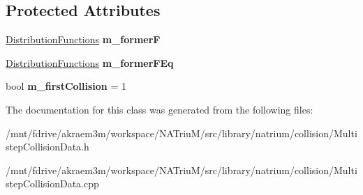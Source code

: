 \subsection*{Protected Attributes}
\begin{DoxyCompactItemize}
\item 
\hypertarget{classnatrium_1_1MultistepCollisionData_aba80100f70bb18575f636eb22c797dca}{
\hyperlink{classnatrium_1_1DistributionFunctions}{DistributionFunctions} {\bfseries m\_\-formerF}}
\label{classnatrium_1_1MultistepCollisionData_aba80100f70bb18575f636eb22c797dca}

\item 
\hypertarget{classnatrium_1_1MultistepCollisionData_a80c382716da26328a29e6cbbae7b5525}{
\hyperlink{classnatrium_1_1DistributionFunctions}{DistributionFunctions} {\bfseries m\_\-formerFEq}}
\label{classnatrium_1_1MultistepCollisionData_a80c382716da26328a29e6cbbae7b5525}

\item 
\hypertarget{classnatrium_1_1MultistepCollisionData_aac893c1a0251015ad0d0bd3e317c7ff2}{
bool {\bfseries m\_\-firstCollision} = 1}
\label{classnatrium_1_1MultistepCollisionData_aac893c1a0251015ad0d0bd3e317c7ff2}

\end{DoxyCompactItemize}


The documentation for this class was generated from the following files:\begin{DoxyCompactItemize}
\item 
/mnt/fdrive/akraem3m/workspace/NATriuM/src/library/natrium/collision/MultistepCollisionData.h\item 
/mnt/fdrive/akraem3m/workspace/NATriuM/src/library/natrium/collision/MultistepCollisionData.cpp\end{DoxyCompactItemize}
